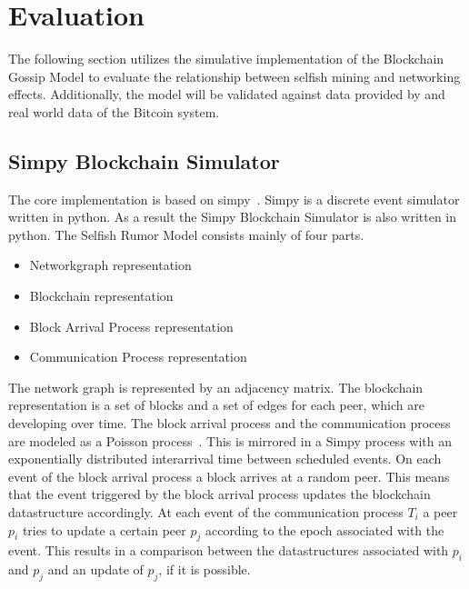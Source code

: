 \chapter{Evaluation}\label{chap:evaluation}
The following section utilizes the simulative implementation of the Blockchain Gossip Model to evaluate the relationship between selfish mining and networking effects. Additionally, the model will be validated against data provided by \gopalan and real world data of the Bitcoin system.
\section{Simpy Blockchain Simulator}
The core implementation is based on simpy~\cite{simpy}. Simpy is a discrete event simulator written in python. As a result the Simpy Blockchain Simulator is also written in python. 
The Selfish Rumor Model consists mainly of four parts. 
\begin{itemize}
\item Networkgraph representation
\item Blockchain representation
\item Block Arrival Process representation
\item Communication Process representation
\end{itemize}
The network graph is represented by an adjacency matrix. The blockchain representation is a set of blocks and a set of edges for each peer, which are developing over time. The block arrival process and the communication process are modeled as a Poisson process~\cite{poisson}. This is mirrored in a Simpy process with an exponentially distributed interarrival time between scheduled events.
On each event of the block arrival process a block arrives at a random peer. This means that the event triggered by the block arrival process updates the blockchain datastructure accordingly.
At each event of the communication process $T_i$ a peer $p_i$ tries to update a certain peer $p_j$ according to the epoch associated with the event. This results in a comparison between the datastructures associated with $p_i$ and $p_j$ and an update of $p_j$, if it is possible.

